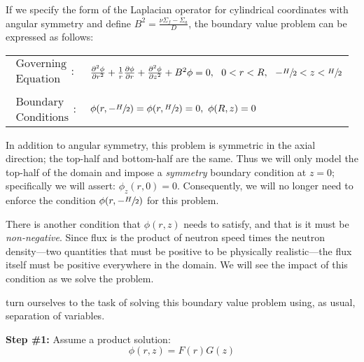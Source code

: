 If we specify the form of the Laplacian operator for cylindrical coordinates with angular symmetry and define $B^2 = \frac{\nu \Sigma_f - \Sigma_a}{D}$, the boundary value problem can be expressed as follows:
\begin{table}[h]
\begin{tabular}{l l}
$\substack{\text{Governing} \\\text{Equation}}: $& $\frac{\partial^2 \phi}{\partial r^2} + \frac{1}{r}\frac{\partial \phi}{\partial r} + \frac{\partial^2 \phi}{\partial z^2} + B^2\phi= 0, \ \ 0<r<R, \ \ -\sfrac{H}{2}<z<\sfrac{H}{2} $\\
& \\
$\substack{\text{Boundary} \\ \text{Conditions}}: $ & $\phi(r,-\sfrac{H}{2}) = \phi(r,\sfrac{H}{2}) = 0, \  \phi(R,z) = 0$  \\ 
\end{tabular}
\end{table} 


In addition to angular symmetry, this problem is symmetric in the axial direction; the top-half and bottom-half are the same.  Thus we will only model the top-half of the domain and impose a \emph{symmetry} boundary condition at $z=0$; specifically we will assert: $\phi_z(r,0) = 0$. Consequently, we will no longer need to enforce the condition $\phi(r,-\sfrac{H}{2})$ for this problem.  

There is another condition that $\phi(r,z)$ needs to satisfy, and that is it must be \emph{non-negative}.  Since flux is the product of neutron speed times the neutron density---two quantities that must be positive to be physically realistic---the flux itself must be positive everywhere in the domain.  We will see the impact of this condition as we solve the problem.

 turn ourselves to the task of solving this boundary value problem using, as usual, separation of variables.

\vspace{0.25cm}

\noindent\textbf{Step \#1:} Assume a product solution:
\begin{equation*}
\phi(r,z) = F(r)G(z)
\end{equation*}

\vspace{0.25cm}

